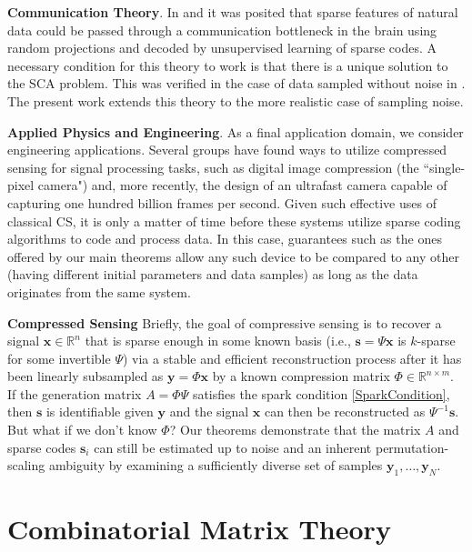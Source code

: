 \documentclass[journal, twocolumn]{IEEEtran}
\begin{document}
\textbf{Communication Theory}.
In \cite{Coulter10} and \cite{Isely10} it was posited that sparse features of natural data could be passed through a communication bottleneck in the brain using random projections and decoded by unsupervised learning of sparse codes.  A necessary condition for this theory to work is that there is a unique solution to the SCA problem.  This was verified in the case of data sampled without noise in \cite{Hillar15}.  The present work extends this theory to the more realistic case of sampling noise.

\textbf{Applied Physics and Engineering}.
As a final application domain, we consider engineering applications.  Several groups have found ways to utilize compressed sensing for signal processing tasks, such as digital image compression \cite{Duarte08} (the ``single-pixel camera") and, more recently, the design of an ultrafast camera \cite{Gao14} capable of capturing one hundred billion frames per second. Given such effective uses of classical CS, it is only a matter of time before these systems utilize sparse coding algorithms to code and process data. In this case, guarantees such as the ones offered by our main theorems allow any such device to be compared to any other (having different initial parameters and data samples) as long as the data originates from the same system.

\textbf{Compressed Sensing} 
Briefly, the goal of compressive sensing is to recover a signal $\mathbf{x} \in \mathbb{R}^n$ that is sparse enough in some known basis (i.e., $\mathbf{s} = \Psi \mathbf{x}$ is $k$-sparse for some invertible $\Psi$) via a stable and efficient reconstruction process after it has been linearly subsampled as $\mathbf{y} = \Phi \mathbf{x}$ by a known compression matrix $\Phi \in \mathbb{R}^{n \times m}$. If the generation matrix $A = \Phi\Psi$ satisfies the spark condition \eqref{SparkCondition}, then $\mathbf{s}$ is identifiable given $\mathbf{y}$ and the signal $\mathbf{x}$ can then be reconstructed as $\Psi^{-1}\mathbf{s}$. But what if we don't know $\Phi$? Our theorems demonstrate that the matrix $A$ and sparse codes $\mathbf{s}_i$ can still be estimated up to noise and an inherent permutation-scaling ambiguity by examining a sufficiently diverse set of samples $\mathbf{y}_1, \ldots, \mathbf{y}_N$. 

\appendices
\section{Combinatorial Matrix Theory}\label{appendixA}
\end{document}
